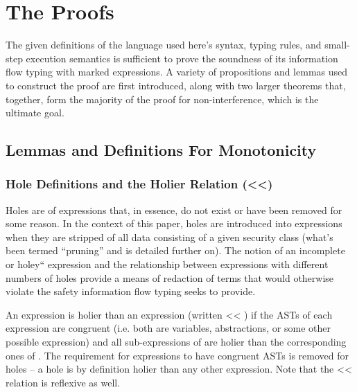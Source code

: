 \documentclass[12pt]{report}
\begin{document}
\begin{prooftree}
\end{prooftree}
\begin{coqdoccode}
\coqdocemptyline
\coqdocemptyline
\coqdocemptyline
\end{coqdoccode}
\section{The Proofs}



 The given definitions of the language used here's syntax, typing
rules, and small-step execution semantics is sufficient to prove the
soundness of its information flow typing with marked
expressions.  A variety of propositions and lemmas used to construct
the proof are first introduced, along with two larger theorems that,
together, form the majority of the proof for non-interference, which
is the ultimate goal. 

\subsection{Lemmas and Definitions For Monotonicity}



\subsubsection{Hole Definitions and the Holier Relation (<<)}



 Holes are of expressions that, in essence, do not exist or
have been removed for some reason. In the context of this paper,
holes are introduced into expressions when they are stripped of all
data consisting of a given security class (what's been termed
``pruning'' and is detailed further on). The notion of an incomplete or
holey`` expression and the relationship between expressions with
    different numbers of holes provide a means of redaction of terms
    that would otherwise violate the safety information flow typing
    seeks to provide.


An expression  is holier than an expression  (written  <<
) if the ASTs of each expression are congruent (i.e. both are
variables, abstractions, or some other possible expression) and all
sub-expressions of  are holier than the corresponding ones of
. The requirement for expressions to have congruent ASTs is
removed for holes – a hole is by definition holier than any other
expression. Note that the << relation is reflexive as well.
\end{document}
